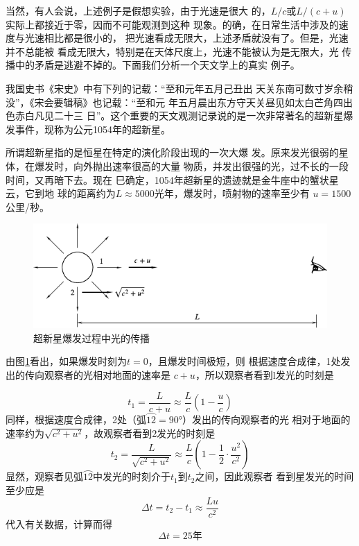 当然，有人会说，上述例子是假想实验，由于光速是很大
的，$L/c$或$L/\left(c+u\right)$实际上都接近于零，因而不可能观测到这种
现象。的确，在日常生活中涉及的速度与光速相比都是很小的，
把光速看成无限大，上述矛盾就没有了。但是，光速并不总能被
看成无限大，特别是在天体尺度上，光速不能被认为是无限大，光
传播中的矛盾是逃避不掉的。下面我们分析一个天文学上的真实
例子。

我国史书《宋史》中有下列的记载：“至和元年五月己丑出
天关东南可数寸岁余稍没”，《宋会要辑稿》也记载：“至和元
年五月晨出东方守天关昼见如太白芒角四出色赤白凡见二十三
日”。这个重要的天文观测记录说的是一次非常著名的超新星爆
发事件，现称为公元1054年的超新星。

所谓超新星指的是恒星在特定的演化阶段出现的一次大爆
发。原来发光很弱的星体，在爆发时，向外抛出速率很高的大量
物质，并发出很强的光，过不长的一段时间，又再暗下去。现在
巳确定，1054年超新星的遗迹就是金牛座中的蟹状星云，它到地
球的距离约为$L \approx 5000$光年，爆发时，喷射物的速率至少有
$u=1500$公里/秒。
\vspace{1em}
\begin{figure}[h]
  \centering
  \includegraphics{figure/fig02.13}
  \caption{超新星爆发过程中光的传播}
  \label{fig:02.13}
\end{figure}

由图\ref{fig:02.13}看出，如果爆发时刻为$t=0$，且爆发时间极短，则
根据速度合成律，1处发出的传向观察者的光相对地面的速率是
$c+u$，所以观察者看到l发光的时刻是

\begin{equation*}
  t_{1}=\frac{L}{c+u} \approx \frac{L}{c}\left(1-\frac{u}{c}\right)
\end{equation*}
同样，根据速度合成律，2处（弧$\wideparen{12}=\ang{90;;}$）发出的传向观察者的光
相对于地面的速率约为$\sqrt{c^2 + u^2}$，故观察者看到2发光的时刻是
\begin{equation*}
  t_{2}=\frac{L}{\sqrt{c^{2}+u^{2}}} \approx \frac{L}{c}\left(1-\frac{1}{2} \cdot \frac{u^{2}}{c^{2}}\right)
\end{equation*}
显然，观察者见弧$\wideparen{12}$中发光的时刻介于$t_1$到$t_2$之间，因此观察者
看到星发光的时间至少应是
\begin{equation*}
  \Delta t=t_{2}-t_{1} \approx \frac{Lu}{c^{2}}
\end{equation*}
代入有关数据，计算而得
\begin{equation*}
  \Delta t=25\text{年}
\end{equation*}

